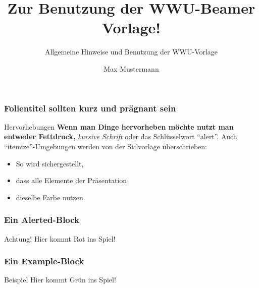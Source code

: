 \documentclass{beamer}
\author{Max Mustermann}
\title{Zur Benutzung der WWU-Beamer Vorlage!}
\subtitle{Allgemeine Hinweise und Benutzung der WWU-Vorlage}
\begin{document}
%



\begin{frame}[plain]
  \maketitle
\end{frame}

\begin{frame}
  \frametitle{Folientitel sollten kurz und pr\"agnant sein}
  \begin{block}{Hervorhebungen}
    \textbf{Wenn man Dinge hervorheben m\"ochte nutzt man entweder Fettdruck,}
    \textit{ kursive Schrift} \alert{ oder das Schl\"usselwort ``alert''}.
  Auch ``itemize''-Umgebungen werden von der Stilvorlage überschrieben:
  \end{block}
  \pause
  \begin{itemize}
    \item So wird sichergestellt,
    \item dass alle Elemente der Präsentation 
    \item dieselbe Farbe nutzen.
  \end{itemize}
\end{frame}

\begin{frame}
  \frametitle{Ein Alerted-Block}
  \begin{alertblock}{Achtung!}
    Hier kommt Rot ins Spiel!
  \end{alertblock}
\end{frame}

\begin{frame}
  \frametitle{Ein Example-Block}
  \begin{exampleblock}{Beispiel}
    Hier kommt Grün ins Spiel!
  \end{exampleblock}
\end{frame}
\end{document}
